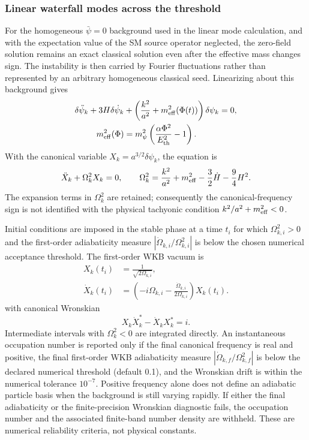 \documentclass[epj]{svjour}
\begin{document}
\subsubsection{Linear waterfall modes across the threshold}
\label{sec:linear_waterfall_modes}

For the homogeneous \(\bar\psi=0\) background used in the linear mode
calculation, and with the expectation value of the SM source operator
neglected, the zero-field solution remains an exact classical solution
even after the effective mass changes sign. The instability is then
carried by Fourier fluctuations rather than represented by an arbitrary
homogeneous classical seed. Linearizing about this background gives
\begin{align}
\delta\ddot\psi_k+3H\delta\dot\psi_k
&+\left(\frac{k^2}{a^2}+m_{\rm eff}^2(\Phi(t))\right)\delta\psi_k
=0,\nonumber\\
m_{\rm eff}^2(\Phi)
&=m_\psi^2
\left(\frac{\alpha\Phi^2}{E_{\rm th}^2}-1\right).
\label{eq:waterfall_mode_eom}
\end{align}
With the canonical variable \(X_k=a^{3/2}\delta\psi_k\), the equation is
\begin{equation}
\ddot X_k+\Omega_k^2 X_k=0,\qquad
\Omega_k^2=\frac{k^2}{a^2}+m_{\rm eff}^2
-\frac{3}{2}\dot H-\frac{9}{4}H^2.
\label{eq:waterfall_canonical_frequency}
\end{equation}
The expansion terms in \(\Omega_k^2\) are retained; consequently the
canonical-frequency sign is not identified with the physical
tachyonic condition \(k^2/a^2+m_{\rm eff}^2<0\).

Initial conditions are imposed in the stable phase at a time \(t_i\)
for which \(\Omega_{k,i}^2>0\) and the first-order adiabaticity measure
\(|\dot\Omega_{k,i}/\Omega_{k,i}^2|\) is below the chosen numerical
acceptance threshold. The first-order WKB vacuum is
\begin{equation}
\begin{aligned}
X_k(t_i)&=\frac{1}{\sqrt{2\Omega_{k,i}}},\\
\dot X_k(t_i)&=
\left(-i\Omega_{k,i}
-\frac{\dot\Omega_{k,i}}{2\Omega_{k,i}}\right)X_k(t_i).
\end{aligned}
\label{eq:waterfall_wkb_initial}
\end{equation}
with canonical Wronskian
\begin{equation}
X_k\dot X_k^*-\dot X_kX_k^*=i.
\label{eq:waterfall_wronskian}
\end{equation}
Intermediate intervals with \(\Omega_k^2<0\) are integrated directly.
An instantaneous occupation number is reported only if the final
canonical frequency is real and positive, the final first-order WKB
adiabaticity measure \(|\dot\Omega_{k,f}/\Omega_{k,f}^2|\) is below
the declared numerical threshold (default 0.1), and the Wronskian drift
is within the numerical tolerance \(10^{-7}\). Positive frequency
alone does not define an adiabatic particle basis when the background
is still varying rapidly. If either the final adiabaticity or the
finite-precision Wronskian diagnostic fails, the occupation number and
the associated finite-band number density are withheld. These are
numerical reliability criteria, not physical constants.
\end{document}
